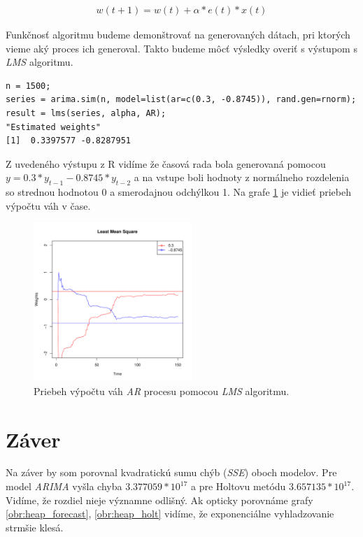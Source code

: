 \documentclass[12pt,a4paper,oneside,final]{article}
\theoremstyle{definition}
\theoremstyle{remark}
\numberwithin{equation}{section}
\begin{document}
\begin{eqnarray} \label{lms}
    w(t+1) = w(t) + \alpha * e(t) * x(t)
\end{eqnarray}

Funkčnosť algoritmu budeme demonštrovať na generovaných dátach, pri ktorých vieme 
aký proces ich generoval. Takto budeme môcť výsledky overiť s výstupom s \emph{LMS} algoritmu.

\begin{minipage}{\linewidth}
\begingroup
\fontsize{9pt}{7pt}\selectfont
\begin{verbatim}
n = 1500;
series = arima.sim(n, model=list(ar=c(0.3, -0.8745)), rand.gen=rnorm);
result = lms(series, alpha, AR);
"Estimated weights"
[1]  0.3397577 -0.8287951
\end{verbatim}
\endgroup
\end{minipage}

Z uvedeného výstupu z R vidíme že časová rada bola generovaná pomocou
$y = 0.3*y_{t-1} - 0.8745*y_{t-2}$ a na vstupe boli hodnoty z normálneho rozdelenia so
strednou hodnotou 0 a smerodajnou odchýlkou 1. Na grafe \ref{obr:lms} je vidieť priebeh
výpočtu váh v čase.

\begin{figure}[H]
    \begin{center}
        \includegraphics[width=.8\textwidth,height=6cm]{images/lms.pdf}
        \caption{Priebeh výpočtu váh \emph{AR} procesu pomocou \emph{LMS} algoritmu.}
        \label{obr:lms}
    \end{center}
\end{figure}

\section{Záver}
Na záver by som porovnal kvadratickú sumu chýb (\emph{SSE}) oboch modelov. Pre
model \emph{ARIMA} vyšla chyba $3.377059*10^{17}$ a pre Holtovu metódu $3.657135*10^{17}$. 
Vidíme, že rozdiel nieje významne odlišný. Ak opticky porovnáme grafy \ref{obr:heap_forecast},
\ref{obr:heap_holt} vidíme, že exponenciálne vyhladzovanie strmšie klesá.
\end{document}
